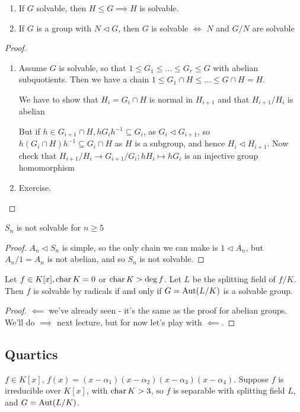 \documentclass[10pt,a4paper]{article}
\begin{document}
\begin{proposition}
\item
\begin{enumerate}
\item If $G$ solvable, then $H \leq G \implies H$ is solvable.
\item If $G$ is a group with $N \triangleleft G$, then $G$ is solvable $\iff$ $N$ and $G/N$ are solvable
\end{enumerate}
\end{proposition}
\begin{proof}
\item
\begin{enumerate}
\item Assume $G$ is solvable, so that $1 \leq G_1 \leq \ldots \leq G_r \leq G$ with abelian subquotients. Then we have a chain $1 \leq G_1 \cap H \leq \ldots \leq G \cap H = H$.

We have to show that $H_i = G_i \cap H$ is normal in $H_{i+1}$ and that $H_{i+1}/H_{i}$ is abelian

But if $h \in G_{i+1} \cap H, h G_i h^{-1} \subseteq G_{i}$, as $G_i \triangleleft G_{i+1}$, so $h(G_i \cap H)h^{-1} \subseteq G_i \cap H$ as $H$ is a subgroup, and hence $H_i \triangleleft H_{i+1}$. Now check that $H_{i+1}/H_{i} \to G_{i+1}/G_i; hH_i \mapsto hG_i$ is an injective group homomorphism

\item Exercise.
\end{enumerate}
\end{proof}
\begin{corollary}
$S_n$ is not solvable for $n \geq 5$
\end{corollary}
\begin{proof}
$A_n \triangleleft S_n$ is simple, so the only chain we can make is $1 \triangleleft A_n$, but $A_n/1 = A_n$ is not abelian, and so $S_n$ is not solvable.
\end{proof}
\begin{theorem}[Galois]
Let $f \in K[x], \operatorname{char} K = 0$ or $\operatorname{char} K > \deg f$. Let $L$ be the splitting field of $f/K$. Then $f$ is solvable by radicals if and only if $G = \operatorname{Aut}(L/K)$ is a solvable group.
\end{theorem}
\begin{proof}
$\impliedby$ we've already seen - it's the same as the proof for abelian groups. We'll do $\implies$ next lecture, but for now let's play with $\impliedby$.
\end{proof}
\subsection*{Quartics}
$f \in K[x]$, $f(x) = (x-\alpha_1)(x-\alpha_2)(x-\alpha_3)(x-\alpha_4)$. Suppose $f$ is irreducible over $K[x]$, with $\operatorname{char} K > 3$, so $f$ is separable with splitting field $L$, and $G = \operatorname{Aut}(L/K)$.
\end{document}
